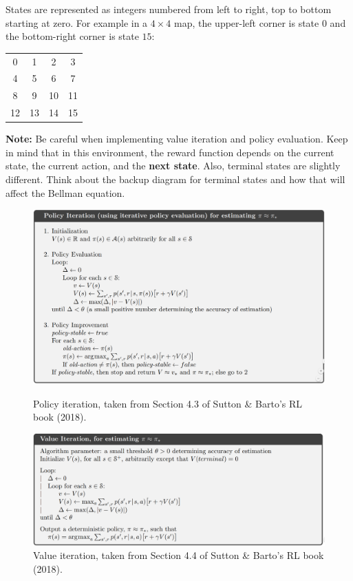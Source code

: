 \documentclass[12pt]{article}
\begin{document}
States are represented as integers numbered from left to right, top to bottom starting at zero. For example in a $4\times 4$ map, the upper-left corner is state $0$ and the bottom-right corner is state $15$:
\begin{center}\begin{tabular}{cccc}
0 & 1 & 2 & 3 \\
4 & 5 & 6 & 7 \\
8 & 9 & 10 & 11 \\
12 & 13 & 14 & 15
\end{tabular}\end{center}

\textbf{Note:} Be careful when implementing value iteration and policy evaluation. Keep in mind that in this environment, the reward function depends on the current state, the current action, and the \textbf{next state}. Also, terminal states are slightly different. Think about the backup diagram for terminal states and how that will affect the Bellman equation.

\begin{center}\begin{figure}[h!]
\includegraphics[width=\textwidth]{figures/policy-iteration.png}
\caption{Policy iteration, taken from Section 4.3 of Sutton \& Barto's RL book (2018).\label{fig:policy-iteration}}
\vspace{15pt}
\includegraphics[width=\textwidth]{figures/value-iteration.png}
\caption{Value iteration, taken from Section 4.4 of Sutton \& Barto's RL book (2018).\label{fig:value-iteration}}
\end{figure}
\end{center}
\end{document}
